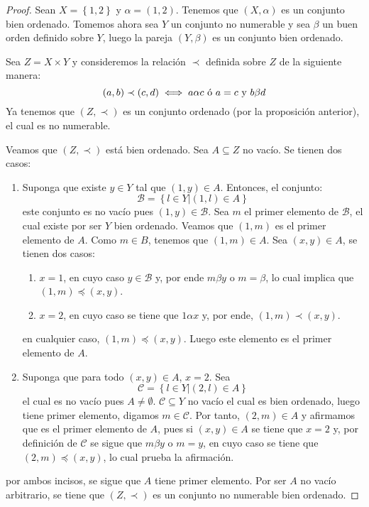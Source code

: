 \documentclass[12pt]{report}
\theoremstyle{largebreak}
\begin{document}
    \begin{proof}
        Sean $X=\left\{1,2\right\}$ y $\alpha=(1,2)$. Tenemos que $(X,\alpha)$ es un conjunto bien ordenado. Tomemos ahora sea $Y$ un conjunto no numerable y sea $\beta$ un buen orden definido sobre $Y$, luego la pareja $(Y,\beta)$ es un conjunto bien ordenado.

        Sea $Z=X\times Y$ y consideremos la relación $\prec$ definida sobre $Z$ de la siguiente manera:
        \begin{equation*}
            (a,b)\prec(c,d)\iff a\alpha c\textup{ ó }a = c\textup{ y } b\beta d
        \end{equation*}
        Ya tenemos que $(Z,\prec)$ es un conjunto ordenado (por la proposición anterior), el cual es no numerable.

        Veamos que $(Z,\prec)$ está bien ordenado. Sea $A\subseteq Z$ no vacío. Se tienen dos casos:
        \begin{enumerate}
            \item Suponga que existe $y\in Y$ tal que $(1,y)\in A$. Entonces, el conjunto:
            \begin{equation*}
                \mathcal{B}=\left\{l\in Y\Big|(1,l)\in A \right\}
            \end{equation*}
            este conjunto es no vacío pues $(1,y)\in\mathcal{B}$. Sea $m$ el primer elemento de $\mathcal{B}$, el cual existe por ser $Y$ bien ordenado. Veamos que $(1,m)$ es el primer elemento de $A$. Como $m\in B$, tenemos que $(1,m)\in A$. Sea $(x,y)\in A$, se tienen dos casos:
            \begin{enumerate}
                \item $x=1$, en cuyo caso $y\in \mathcal{B}$ y, por ende $m\beta y$ o $m=\beta$, lo cual implica que $(1,m)\preceq(x,y)$.
                \item $x=2$, en cuyo caso se tiene que $1\alpha x$ y, por ende, $(1,m)\prec(x,y)$.
            \end{enumerate}
            en cualquier caso, $(1,m)\preceq(x,y)$. Luego este elemento es el primer elemento de $A$.
            \item Suponga que para todo $(x,y)\in A$, $x=2$. Sea
            \begin{equation*}
                \mathcal{C}=\left\{l\in Y\Big|(2,l)\in A \right\}
            \end{equation*}
            el cual es no vacío pues $A\neq\emptyset$. $\mathcal{C}\subseteq Y$ no vacío el cual es bien ordenado, luego tiene primer elemento, digamos $m\in\mathcal{C}$. Por tanto, $(2,m)\in A$ y afirmamos que es el primer elemento de $A$, pues si $(x,y)\in A$ se tiene que $x=2$ y, por definición de $\mathcal{C}$ se sigue que $m\beta y$ o $m=y$, en cuyo caso se tiene que $(2,m)\preceq (x,y)$, lo cual prueba la afirmación.
        \end{enumerate}
        por ambos incisos, se sigue que $A$ tiene primer elemento. Por ser $A$ no vacío arbitrario, se tiene que $(Z,\prec)$ es un conjunto no numerable bien ordenado.


\end{proof}
\end{document}
